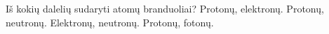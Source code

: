 Iš kokių dalelių sudaryti atomų branduoliai?
Protonų, elektronų.
Protonų, neutronų.
Elektronų, neutronų.
Protonų, fotonų.